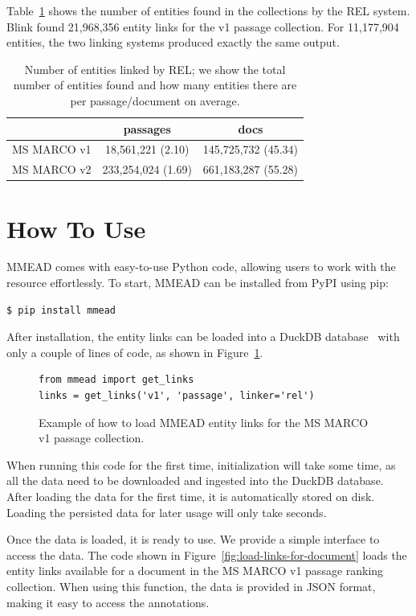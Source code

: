 Table~\ref{number-links} shows the number of entities found in the collections by the REL system. Blink found 21,968,356 entity links for the v1 passage collection.  For 11,177,904 entities, the two linking systems produced exactly the same output. 

\begin{table}
\centering
\caption{Number of entities linked by REL; we show the total number of entities found and how many entities there are per passage/document on average.}
\begin{tabular}{c|c|c}
	\toprule
	& passages & docs \\
	\midrule
	MS MARCO v1 & 18,561,221 (2.10) & 145,725,732 (45.34) \\
	MS MARCO v2 & 233,254,024 (1.69) & 661,183,287 (55.28) \\
	\bottomrule
\end{tabular}
\label{number-links}
\end{table}

\section{How To Use}

MMEAD comes with easy-to-use Python code, allowing users to work with the resource effortlessly. To start, MMEAD can be installed from PyPI using pip:

\begin{verbatim}
$ pip install mmead
\end{verbatim}

After installation, the entity links can be loaded into a DuckDB database~\citep{duckdb} with only a couple of lines of code, as shown in Figure~\ref{fig:load-links}.
%
\begin{figure}
\begin{verbatim}
from mmead import get_links
links = get_links('v1', 'passage', linker='rel')
\end{verbatim}
\caption{Example of how to load MMEAD entity links for the MS MARCO v1 passage collection.}
\label{fig:load-links}
\end{figure}
%
When running this code for the first time, initialization will take some time, as all the data need to be downloaded and ingested into the DuckDB database. After loading the data for the first time, it is automatically stored on disk. Loading the persisted data for later usage will only take seconds.

Once the data is loaded, it is ready to use. We provide a simple interface to access the data. The code shown in Figure~\ref{fig:load-links-for-document} loads the entity links available for a document in the MS MARCO v1 passage ranking collection. When using this function, the data is provided in JSON format, making it easy to access the annotations.

